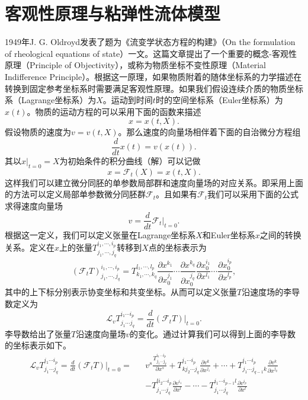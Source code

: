\section{客观性原理与粘弹性流体模型}
1949年J. G. Oldroyd发表了题为《流变学状态方程的构建》（On the formulation of rheological equations of state）一文\cite{oldroyd1950formulation}。这篇文章提出了一个重要的概念-客观性原理（Principle of Objectivity），或称为物质坐标不变性原理（Material Indifference Principle）。根据这一原理，如果物质附着的随体坐标系的力学描述在转换到固定参考坐标系时需要满足客观性原理。如果我们假设连续介质的物质坐标系（Lagrange坐标系）为$X$。运动到时间$t$时的空间坐标系（Euler坐标系）为$x(t)$。物质的运动方程的可以采用下面的函数来描述
\begin{equation*}
	x = x (t,X).
\end{equation*}
假设物质的速度为$v = v (t,X)$。那么速度的向量场相伴着下面的自治微分方程组
\begin{equation*}
	\frac{d}{dt} x(t) = v (x(t)).
\end{equation*}
其以$x|_{t=0}=X$为初始条件的积分曲线（解）可以记做
\begin{equation*}
	x = \mathcal{F}_t (X) = x (t,X).
\end{equation*}
这样我们可以建立微分同胚的单参数局部群和速度向量场的对应关系。即采用上面的方法可以定义局部单参数微分同胚群$\mathcal{F}_t$。且如果有$\mathcal{F}_t$我们可以采用下面的公式求得速度向量场
\begin{equation*}
	v = \frac{d}{dt} \mathcal{F}_t \big|_{t=0}.
\end{equation*}
根据这一定义，我们可以定义张量在Lagrange坐标系$X$和Euler坐标系$x$之间的转换关系。定义在$x$上的张量$T^{i_1,\cdots,i_p}_{j_1, \cdots,j_q}$转移到$X$点的坐标表示为
\begin{equation*}
	(\mathcal{F}_t T)^{i_1,\cdots,i_p}_{j_1, \cdots,j_q} = T^{l_1,\cdots,l_p}_{k_1, \cdots,k_q} \frac{\partial x^{k_1}}{\partial x_0^{j_1}} \cdots \frac{\partial x^{k_q}}{\partial x_0^{j_q}} \frac{\partial x_0^{i_1}}{\partial x^{l_1}} \cdots \frac{\partial x_0^{i_p}}{\partial x^{l_p}},  
\end{equation*}
其中的上下标分别表示协变坐标和共变坐标。从而可以定义张量$T$沿速度场的李导数定义为
\begin{equation*}
	{\mathcal{L}_v T^{i_1 \cdots i_p}_{j_1 \cdots j_q} =\frac{d}{dt} (\mathcal{F}_t T)} |_{t=0}.
\end{equation*}
李导数给出了张量$T$沿速度向量场$v$的变化。通过计算我们可以得到上面的李导数的坐标表示如下。
\begin{eqnarray} \label{eq:Lie}
	 {\mathcal{L}_v T^{i_1 \cdots i_p}_{j_1 \cdots j_q} = \frac{d}{dt} (\mathcal{F}_t T)} |_{t=0}  = && v^s \frac{T^{i_1 \cdots i_p}_{j_1\cdots j_q}}{\partial x^s} + T^{i_1 \cdots i_p}_{k j_2 \cdots j_q}\frac{\partial v^k}{\partial x^{j_1}} + \cdots + T^{i_1 \cdots i_p}_{j_1\cdots j_{q-1}k}\frac{\partial v^k}{\partial x^{j_q}} 
	\\ && - T^{li_2 \cdots i_p}_{j_1\cdots j_q}\frac{\partial v^{i_1}}{\partial x^l}- \cdots - T^{i_1 \cdots i_{p-1}l}_{j_1\cdots j_q}\frac{\partial v^{i_p}}{\partial x^l} \nonumber
\end{eqnarray}
